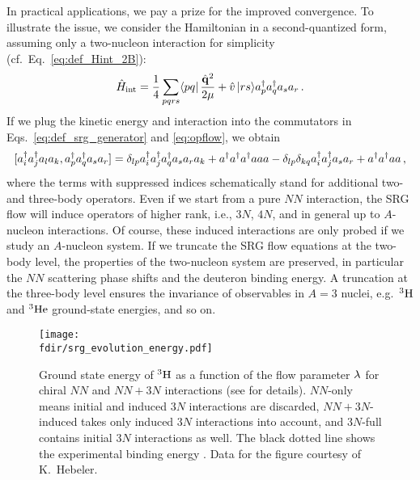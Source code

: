 {In practical applications, we pay a prize for the improved convergence.
To illustrate the issue, we consider the Hamiltonian in a second-quantized 
form, assuming only a two-nucleon interaction for simplicity (cf.~Eq.~\eqref{eq:def_Hint_2B}):
\begin{equation}
  \Hint = \frac{1}{4}\sum_{pqrs} \matrixe{pq}{\frac{\qOV^2}{2\mu}+\vO}{rs}\aaO_p\aaO_q\aO_s\aO_r\,.
\end{equation}
If we plug the kinetic energy and interaction into the commutators in 
Eqs.~\eqref{eq:def_srg_generator} and \eqref{eq:opflow}, we obtain
\begin{equation}\label{eq:comm2B_vac}
  \comm{\aaO_i\aaO_j\aO_l\aO_k}{\aaO_p\aaO_q\aO_s\aO_r}=
  \delta_{lp}\aaO_i\aaO_j\aaO_q\aO_s\aO_r\aO_k + \aaO\aaO\aaO\aO\aO\aO
  -\delta_{lp}\delta_{kq}\aaO_i\aaO_j\aO_s\aO_r + \aaO\aaO\aO\aO\,, 
\end{equation}
where the terms with suppressed indices schematically stand for additional 
two- and three-body operators. Even if we start from a pure $NN$
interaction, the SRG flow will induce operators of higher rank, i.e., 
$3N$, $4N$, and in general up to $A$-nucleon interactions. Of course, 
these induced interactions are only probed if we study an $A$-nucleon 
system. If we truncate the SRG flow equations at the two-body level, 
the properties of the two-nucleon system are preserved, in particular
the $NN$ scattering phase shifts and the deuteron binding energy. A 
truncation at the three-body level ensures the invariance of observables 
in $A=3$ nuclei, e.g.~$\nuc{H}{3}$ and $\nuc{He}{3}$ ground-state energies, 
and so on. 


\begin{figure*}[t]
  \setlength{\unitlength}{\textwidth}
  \begin{center}
    \texttt{[image: \\fdir/srg\_evolution\_energy.pdf]}
  \end{center}  
  \vspace{-10pt}
  \caption{\label{fig:triton}Ground state energy of $\nuc{H}{3}$ as a function 
  of the flow parameter $\lambdaSRG$ for chiral \NNLO{} $NN$ and $NN\!+\!3N$ 
  interactions (see \cite{Hebeler:2012ly} for details). $NN$-only means initial and 
  induced $3N$ interactions are discarded, $NN\!+\!3N$-induced takes only 
  induced $3N$ interactions into account, and $3N$-full contains initial
  $3N$ interactions as well. The black dotted line shows the experimental 
  binding energy \cite{Wang:2012uq}. Data for the figure courtesy of 
  K.~Hebeler.}
\end{figure*}

}
